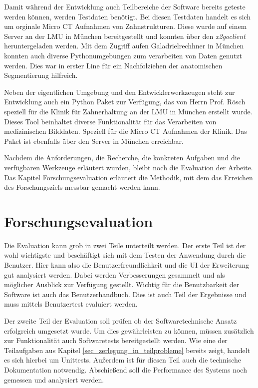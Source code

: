 Damit während der Entwicklung auch Teilbereiche der Software bereits geteste werden
können, werden Testdaten benötigt. Bei diesen Testdaten handelt es sich um orginale
Micro CT Aufnahmen von Zahnstrukturen. Diese wurde auf einem Server an der LMU
in München bereitgestellt und konnten über den \textit{x2goclient} heruntergeladen
werden. Mit dem Zugriff aufen Galadrielrechhner in München konnten auch diverse
Pythonumgebungen zum verarbeiten von Daten genutzt werden. Dies war in erster Line
für ein Nachfolziehen der anatomischen Segmentierung hilfreich.

Neben der eigentlichen Umgebung und den Entwicklerwerkzeugen steht zur Entwicklung
auch ein Python Paket zur Verfügung, das von Herrn Prof. Rösch speziell für die Klinik
für Zahnerhaltung an der LMU in München erstellt wurde. Dieses Tool beinhaltet
diverse Funktionalität für das Verarbeiten von medizinischen Bilddaten. Speziell
für die Micro CT Aufnahmen der Klinik. Das Paket ist ebenfalls über den Server
in München erreichbar.

Nachdem die Anforderungen, die Recherche, die konkreten Aufgaben und die
verfügbaren Werkzeuge erläutert wurden, bleibt noch die Evaluation der Arbeite.
Das Kapitel Forschungsevaluation erläutert die Methodik, mit dem das Erreichen des
Forschungsziels messbar gemacht werden kann.


\section{Forschungsevaluation}
Die Evaluation kann grob in zwei Teile unterteilt werden. Der erste Teil ist der
wohl wichtigste und beschäftigt sich mit dem Testen der Anwendung durch die Benutzer.
Hier kann also die Benutzerfreundlichkeit und die UI der Erweiterung gut
analysiert werden. Dabei werden Verbesserungen gesammelt und als möglicher Ausblick
zur Verfügung gestellt. Wichtig für die Benutzbarkeit der Software ist auch das
Benutzerhandbuch. Dies ist auch Teil der Ergebnisse und muss mittels Benutzertest
evaluiert werden.

Der zweite Teil der Evaluation soll prüfen ob der Softwaretechnische Ansatz erfolgreich
umgesetzt wurde. Um dies gewährleisten zu können, müssen zusätzlich zur Funktionalität
auch Softwaretests bereitgestellt werden. Wie eine der Teilaufgaben aus Kapitel
\ref{sec_zerlegung_in_teilprobleme} bereits zeigt, handelt es sich hierbei um Unittests.
Außerdem ist für diesen Teil auch die technische Dokumentation notwendig. Abschießend
soll die Performance des Systems noch gemessen und analysiert werden.
